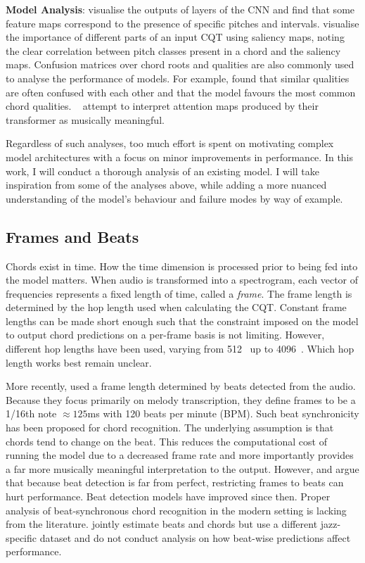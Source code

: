 \textbf{Model Analysis}: \citet{FeatureMaps} visualise the outputs of layers of the CNN and find that some feature maps correspond to the presence of specific pitches and intervals. \citet{SaliencyChroma} visualise the importance of different parts of an input CQT using saliency maps, noting the clear correlation between pitch classes present in a chord and the saliency maps. Confusion matrices over chord roots and qualities are also commonly used to analyse the performance of models. For example, \citet{StructuredTraining} found that similar qualities are often confused with each other and that the model favours the most common chord qualities. ~\citet{BTC} attempt to interpret attention maps produced by their transformer as musically meaningful.

Regardless of such analyses, too much effort is spent on motivating complex model architectures with a focus on minor improvements in performance. In this work, I will conduct a thorough analysis of an existing model. I will take inspiration from some of the analyses above, while adding a more nuanced understanding of the model's behaviour and failure modes by way of example.

\subsection{Frames and Beats}

Chords exist in time. How the time dimension is processed prior to being fed into the model matters. When audio is  transformed into a spectrogram, each vector of frequencies represents a fixed length of time, called a \emph{frame}. The frame length is determined by the hop length used when calculating the CQT. Constant frame lengths can be made short enough such that the constraint imposed on the model to output chord predictions on a per-frame basis is not limiting. However, different hop lengths have been used, varying from 512~\cite{ACRLargeVocab1} up to 4096~\citep{StructuredTraining}. Which hop length works best remain unclear.

More recently, \citet{MelodyTranscriptionViaGenerativePreTraining} used a frame length determined by beats detected from the audio. Because they focus primarily on melody transcription, they define frames to be a 1/16th note $\approx 125$ms with 120 beats per minute (BPM). Such beat synchronicity has been proposed for chord recognition. The underlying assumption is that chords tend to change on the beat. This reduces the computational cost of running the model due to a decreased frame rate and more importantly provides a far more musically meaningful interpretation to the output. However, \citet{CommonVariations} and \citet{RelativePerformance} argue that because beat detection is far from perfect, restricting frames to beats can hurt performance. Beat detection models have improved since then. Proper analysis of beat-synchronous chord recognition in the modern setting is lacking from the literature.  \citet{ChorusAlignmentJAAH} jointly estimate beats and chords but use a different jazz-specific dataset and do not conduct analysis on how beat-wise predictions affect performance.

